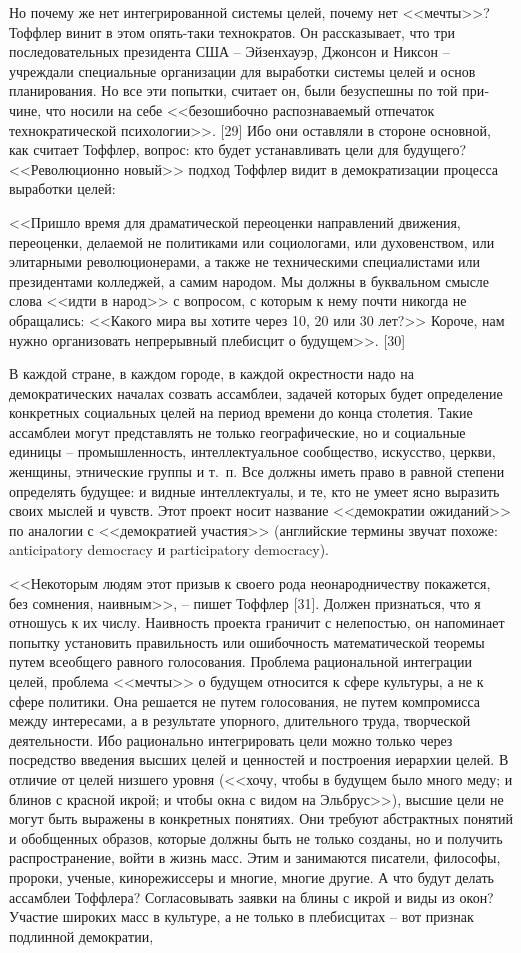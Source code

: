 \documentclass{book}
\begin{document}
Но почему же нет интегрированной системы целей, почему нет <<мечты>>? Тоффлер винит в этом опять-таки технократов. Он рассказывает, что три последовательных президента США -- Эйзенхауэр, Джонсон и Никсон -- учреждали специальные орга­низации для выработки системы целей и основ планирования. Но все эти попытки, считает он, были безуспешны по той при­чине, что носили на себе <<безошибочно распознаваемый отпе­чаток технократической психологии>>. [29] Ибо они оставляли в стороне основной, как считает Тоффлер, вопрос: кто будет устанавливать цели для будущего? <<Революционно новый>> под­ход Тоффлер видит в демократизации процесса выработки це­лей:

<<Пришло время для драматической переоценки направлений движения, переоценки, делаемой не политиками или социоло­гами, или духовенством, или элитарными революционерами, а также не техническими специалистами или президентами кол­леджей, а самим народом. Мы должны в буквальном смысле слова <<идти в народ>> с вопросом, с которым к нему почти ни­когда не обращались: <<Какого мира вы хотите через 10, 20 или 30 лет?>> Короче, нам нужно организовать непрерывный плебис­цит о будущем>>. [30]

В каждой стране, в каждом городе, в каждой окрестности надо на демократических началах созвать ассамблеи, задачей которых будет определение конкретных социальных целей на период времени до конца столетия. Такие ассамблеи могут представлять не только географические, но и социальные единицы -- промышленность, интеллектуальное сообщество, искусство, церкви, женщины, этнические группы и т.~п. Все должны иметь право в равной степени определять будущее: и видные интеллектуалы, и те, кто не умеет ясно выразить своих мыслей и чувств. Этот проект носит название <<демократии ожиданий>> по аналогии с <<демократией участия>> (английские термины звучат похоже: anticipatory democracy и participatory democracy).

<<Некоторым людям этот призыв к своего рода неонародни­честву покажется, без сомнения, наивным>>, -- пишет Тоф­флер [31]. Должен признаться, что я отношусь к их числу. Наив­ность проекта граничит с нелепостью, он напоминает попытку установить правильность или ошибочность математической те­оремы путем всеобщего равного голосования. Проблема раци­ональной интеграции целей, проблема <<мечты>> о будущем от­носится к сфере культуры, а не к сфере политики. Она решает­ся не путем голосования, не путем компромисса между инте­ресами, а в результате упорного, длительного труда, творче­ской деятельности. Ибо рационально интегрировать цели можно только через посредство введения высших целей и ценностей и построения иерархии целей. В отличие от целей низшего уров­ня (<<хочу, чтобы в будущем было много меду; и блинов с крас­ной икрой; и чтобы окна с видом на Эльбрус>>), высшие цели не могут быть выражены в конкретных понятиях. Они требуют абстрактных понятий и обобщенных образов, которые должны быть не только созданы, но 
и 
получить распространение, войти в жизнь масс. Этим и занимаются писатели, философы, пророки, ученые, кинорежиссеры и многие, многие другие. А что будут делать ассамблеи Тоффлера? Согласовывать заявки на блины с икрой и виды из окон? Участие широких масс в культуре, а не только в плебисцитах -- вот признак подлинной демокра­тии,
\end{document}
